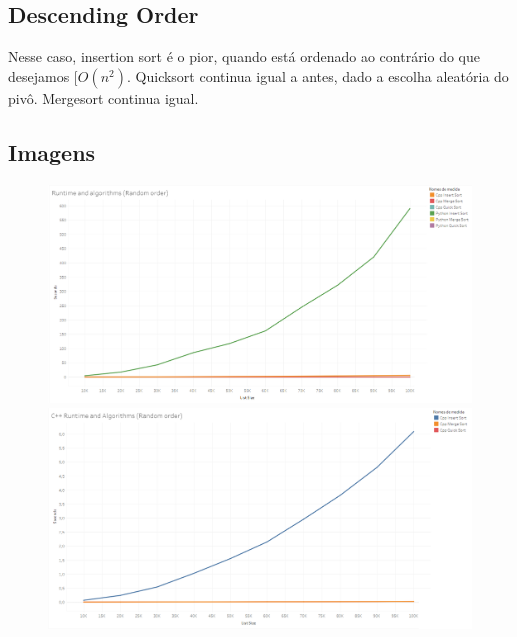 \documentclass{article}
\begin{document}
	\subsection{Descending Order}
	
	
	Nesse caso, insertion sort é o pior, quando está ordenado ao contrário do que desejamos $[O(n^2)$. Quicksort continua igual a antes, dado a escolha aleatória do pivô. Mergesort continua igual.
	
	\subsection{Imagens}
	\begin{figure}[!h]
		\centering
		\includegraphics[scale=0.3]{images/runtime_ALL-random.png}
		\includegraphics[scale=0.3]{images/runtime_cppONLY-random.png}
	\end{figure}
	
\end{document}
